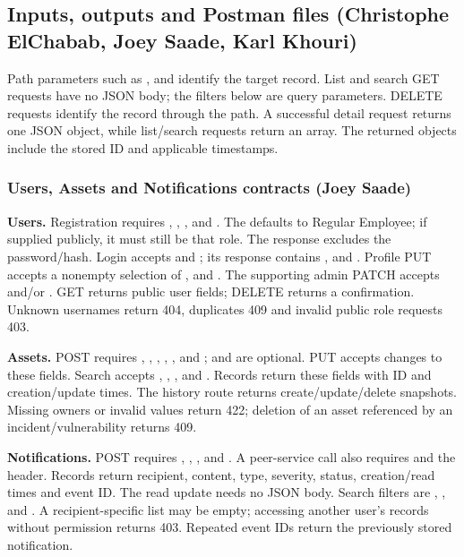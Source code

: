 \subsection{Inputs, outputs and Postman files (Christophe ElChabab, Joey Saade, Karl Khouri)}
Path parameters such as ,  and  identify the target record. List and search GET requests have no JSON body; the filters below are query parameters. DELETE requests identify the record through the path. A successful detail request returns one JSON object, while list/search requests return an array. The returned objects include the stored ID and applicable timestamps.

\subsubsection{Users, Assets and Notifications contracts (Joey Saade)}
\textbf{Users.} Registration requires , , ,  and . The  defaults to Regular Employee; if supplied publicly, it must still be that role. The response excludes the password/hash. Login accepts  and ; its response contains ,  and . Profile PUT accepts a nonempty selection of ,  and . The supporting admin PATCH accepts  and/or . GET returns public user fields; DELETE returns a confirmation. Unknown usernames return 404, duplicates 409 and invalid public role requests 403.

\textbf{Assets.} POST requires , , , , ,  and ;  and  are optional. PUT accepts changes to these fields. Search accepts , , ,  and . Records return these fields with ID and creation/update times. The history route returns create/update/delete snapshots. Missing owners or invalid values return 422; deletion of an asset referenced by an incident/vulnerability returns 409.

\textbf{Notifications.} POST requires , , ,  and . A peer-service call also requires  and the  header. Records return recipient, content, type, severity, status, creation/read times and event ID. The read update needs no JSON body. Search filters are , ,  and . A recipient-specific list may be empty; accessing another user's records without permission returns 403. Repeated event IDs return the previously stored notification.

